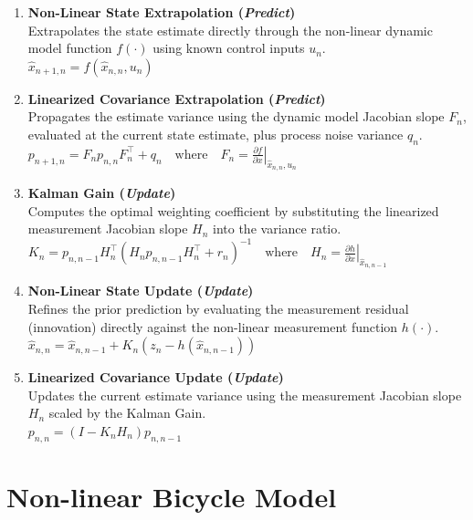 \begin{enumerate}[label=\textbf{Step \arabic*:}, leftmargin=*, itemsep=1em]
	
	\item \textbf{Non-Linear State Extrapolation (\emph{Predict})}\\
	Extrapolates the state estimate directly through the non-linear dynamic model function $f(\cdot)$ using known control inputs $u_n$.\\
	$\hat{x}_{n+1,n} = f\left(\hat{x}_{n,n}, u_n\right)$
	
	\item \textbf{Linearized Covariance Extrapolation (\emph{Predict})}\\
	Propagates the estimate variance using the dynamic model Jacobian slope $F_n$, evaluated at the current state estimate, plus process noise variance $q_n$.\\
	$p_{n+1,n} = F_n p_{n,n} F_n^\top + q_n \quad \text{where} \quad F_n = \left. \frac{\partial f}{\partial x} \right|_{\hat{x}_{n,n}, u_n}$
	
	\item \textbf{Kalman Gain (\emph{Update})}\\
	Computes the optimal weighting coefficient by substituting the linearized measurement Jacobian slope $H_n$ into the variance ratio.\\
	$K_n = p_{n,n-1} H_n^\top \left(H_n p_{n,n-1} H_n^\top + r_n\right)^{-1} \quad \text{where} \quad H_n = \left. \frac{\partial h}{\partial x} \right|_{\hat{x}_{n,n-1}}$
	
	\item \textbf{Non-Linear State Update (\emph{Update})}\\
	Refines the prior prediction by evaluating the measurement residual (innovation) directly against the non-linear measurement function $h(\cdot)$.\\
	$\hat{x}_{n,n} = \hat{x}_{n,n-1} + K_n\left(z_n - h\left(\hat{x}_{n,n-1}\right)\right)$
	
	\item \textbf{Linearized Covariance Update (\emph{Update})}\\
	Updates the current estimate variance using the measurement Jacobian slope $H_n$ scaled by the Kalman Gain.\\
	$p_{n,n} = \left(I - K_n H_n\right) p_{n,n-1}$
	
\end{enumerate}

\section{Non-linear Bicycle Model}
\label{sec:bicycle_model}


